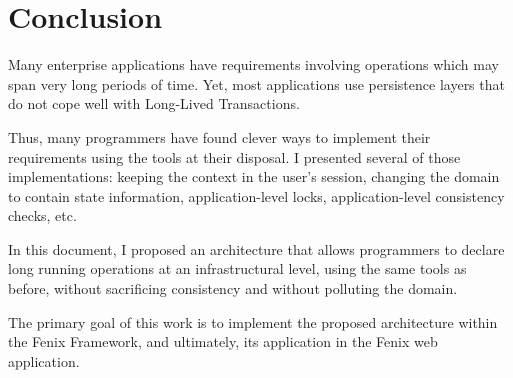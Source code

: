 \documentclass{llncs}
\begin{document}
\section{Conclusion}

Many enterprise applications have requirements involving operations
which may span very long periods of time. Yet, most applications use
persistence layers that do not cope well with Long-Lived Transactions.

Thus, many programmers have found clever ways to implement their
requirements using the tools at their disposal. I presented several of
those implementations: keeping the context in the user's session,
changing the domain to contain state information, application-level
locks, application-level consistency checks, etc.

In this document, I proposed an architecture that allows programmers
to declare long running operations at an infrastructural level, using
the same tools as before, without sacrificing consistency and without
polluting the domain.

The primary goal of this work is to implement the proposed
architecture within the Fenix Framework, and ultimately, its
application in the Fenix web application.

\clearpage  
\end{document}
